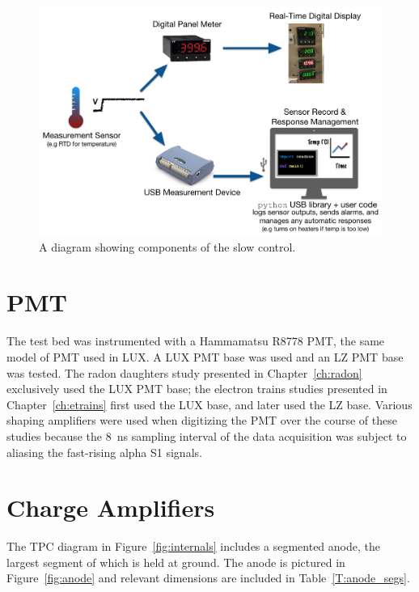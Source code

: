 \begin{figure}[htbp]
\begin{center}
\includegraphics[width=\textwidth]{figures/testbed/slow_control.png}
\caption{A diagram showing components of the slow control.}
\label{fig:sc}
\end{center}
\end{figure}


\section{PMT}
The test bed was instrumented with a Hammamatsu R8778 \ac{PMT}, the same model of \ac{PMT} used in \ac{LUX}. A \ac{LUX} \ac{PMT} base was used and an \ac{LZ} \ac{PMT} base was tested. The radon daughters study presented in Chapter~\ref{ch:radon} exclusively used the \ac{LUX} \ac{PMT} base; the electron trains studies presented in Chapter~\ref{ch:etrains} first used the \ac{LUX} base, and later used the \ac{LZ} base. Various shaping amplifiers were used when digitizing the \ac{PMT} over the course of these studies because the 8~ns sampling interval of the data acquisition was subject to aliasing the fast-rising alpha S1 signals.



\section{Charge Amplifiers}
The \ac{TPC} diagram in Figure~\ref{fig:internals} includes a segmented anode, the largest segment of which is held at ground. The anode is pictured in Figure~\ref{fig:anode} and relevant dimensions are included in Table~\ref{T:anode_segs}.

